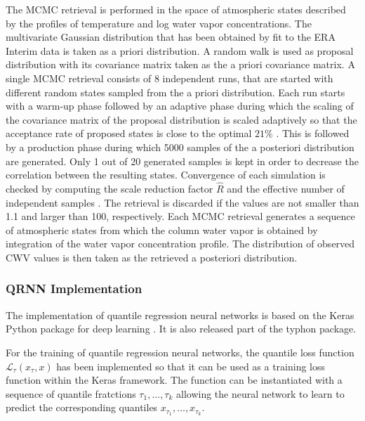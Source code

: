 \documentclass[journal abbreviation, manuscript]{copernicus}
\begin{document}
  The MCMC retrieval is performed in the space of atmospheric states described
  by the profiles of temperature and log water vapor concentrations. The
  multivariate Gaussian distribution that has been obtained by fit to the ERA
  Interim data is taken as a priori distribution. A random walk is used as
  proposal distribution with its covariance matrix taken as the a priori
  covariance matrix. A single MCMC retrieval consists of 8 independent runs,
  that are started with different random states sampled from the a priori
  distribution. Each run starts with a warm-up phase followed by an adaptive
  phase during which the scaling of the covariance matrix of the proposal
  distribution is scaled adaptively so that the acceptance rate of proposed states is
  close to the optimal $21\%$ \citep{bda}. This is followed by a production
  phase during which 5000 samples of the a posteriori distribution are
  generated. Only 1 out of 20 generated samples is kept in order to decrease the
  correlation between the resulting states. Convergence of each simulation is
  checked by computing the scale reduction factor $\hat{R}$ and the effective
  number of independent samples \citep[eqs. (11.12), (11.13)]{bda}. The
  retrieval is discarded if the values are not smaller than 1.1 and larger than
  100, respectively. Each MCMC retrieval generates a sequence of atmospheric
  states from which the column water vapor is obtained by integration of the
  water vapor concentration profile. The distribution of observed CWV values
  is then taken as the retrieved a posteriori distribution.

  
\subsubsection{QRNN Implementation}
\label{sec:qrnn_implementation}

  The implementation of quantile regression neural networks is based on the
  Keras Python package for deep learning \citep{keras}. It is also released
  part of the typhon package.

  For the training of quantile regression neural networks, the quantile loss
  function $\mathcal{L}_\tau(x_\tau, x)$ has been implemented so that it can be
  used as a training loss function within the Keras framework. The function can
  be instantiated with a sequence of quantile fratctions $\tau_1, \ldots,
  \tau_k$ allowing the neural network to learn to predict the corresponding
  quantiles $x_{\tau_1}, \ldots, x_{\tau_k}$.
\end{document}
